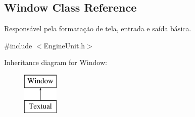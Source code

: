 \hypertarget{classWindow}{\subsection{Window Class Reference}
\label{dc/dc4/classWindow}
}


Responsável pela formatação de tela, entrada e saída básica.  




{\ttfamily \#include $<$Engine\-Unit.\-h$>$}

Inheritance diagram for Window\-:\begin{figure}[H]
\begin{center}
\leavevmode
\includegraphics[height=2.000000cm]{dc/dc4/classWindow}
\end{center}
\end{figure}
